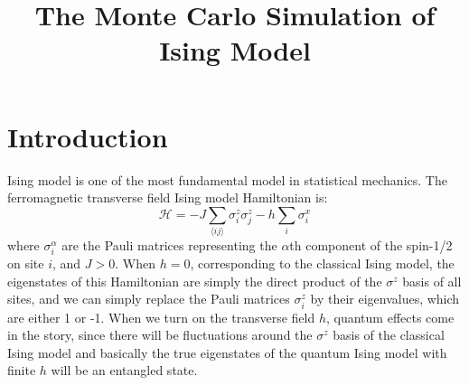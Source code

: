 \documentclass{article}
\title{The Monte Carlo Simulation of Ising Model}
\author{}
\date{}
\theoremstyle{plain} \newtheorem{thm}{Theorem}[section]
\theoremstyle{definition} \newtheorem{df}{Definition}[section]
\theoremstyle{definition} \newtheorem{eg}{Example}
\theoremstyle{remark} \newtheorem*{rmk}{Remark}
\begin{document}
\maketitle


\section{Introduction}
Ising model is one of the most fundamental model in statistical mechanics. The ferromagnetic transverse field Ising model Hamiltonian is:
\begin{equation}
	\mathcal{H}=-J\sum_{\langle ij\rangle}\sigma^z_i\sigma^z_j-h\sum_i\sigma_i^x
\end{equation}
where $\sigma_i^\alpha$ are the Pauli matrices representing the $\alpha$th component of the spin-1/2 on site $i$, and $J>0$. When $h=0$, corresponding to the classical Ising model, the eigenstates of this Hamiltonian are simply the direct product of the $\sigma^z$ basis of all sites, and we can simply replace the Pauli matrices $\sigma_i^z$ by their eigenvalues, which are either 1 or -1. When we turn on the transverse field $h$, quantum effects come in the story, since there will be fluctuations around the $\sigma^z$ basis of the classical Ising model and basically the true eigenstates of the quantum Ising model with finite $h$ will be an entangled state. 
\end{document}
